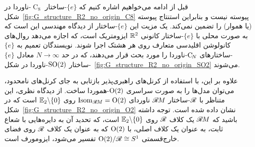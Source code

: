 

قبل از ادامه می‌خواهیم اشاره کنیم که $\{e\}$-ساختار $\operatorname{C}_8$-ناوردا در شکل~\ref{fig:G_structure_R2_no_origin_C8} پیوسته نیست و بنابراین استنتاج پیوسته (یا هموار) را تضمین نمی‌کند.
یک مزیت این $\{e\}$-ساختار از دیدگاه مهندسی این است که به صورت محلی با $\{e\}$-ساختار کانونی $\mathbb{R}^2$ ایزومتریک است، که اجازه می‌دهد روال‌های کانولوشن اقلیدسی متعارف روی هر هشتک اجرا شوند.
نویسندگان تعمیم به $\{e\}$-ساختارهای $\operatorname{C}_{\!N}$-ناوردا را مورد بحث قرار می‌دهند، که در حد $N\to\infty$ معادل $\{e\}$-ساختار $\operatorname{SO}(2)$-ناوردا در شکل~\ref{fig:G_structure_R2_no_origin_SO2} می‌شوند.

علاوه بر این، با استفاده از کرنل‌های راهبری‌پذیر بازتابی به جای کرنل‌های نامحدود، می‌توان مدل‌ها را به صورت سراسری $\operatorname{O}(2)$-هموردا ساخت.
از دیدگاه نظری، این متناظر با $\mathscr{R}$-ساختار $\mathscr{R}\mkern-1.8muM$ ناوردای $\operatorname{Isom}_{\mathscr{R}\mkern-1.8muM} = \operatorname{O}(2)$ روی $\mathbb{E}_2 \backslash \{0\}$ است که در شکل~\ref{fig:G_structure_R2_no_origin_O2} نشان داده شده است.
توجه داشته باشید که $\mathscr{R}\mkern-1.8muM$ یک کلاف $\mathscr{R}$ روی $\mathbb{E}_2 \backslash \{0\}$ است، که تحدید آن به دایره‌هایی با شعاع ثابت، به عنوان یک کلاف اصلی، با $\operatorname{O}(2)$ که به عنوان یک کلاف $\mathscr{R}$ روی فضای خارج‌قسمتی $\operatorname{O}(2)/\mathscr{R} \cong S^1$ تفسیر می‌شود، ایزومورف است.